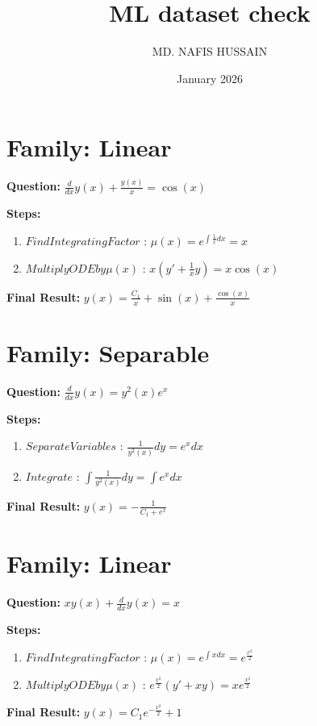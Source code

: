 \documentclass{article}
\title{ML dataset check}
\author{MD. NAFIS HUSSAIN}
\date{January 2026}
\begin{document}
\maketitle
\section*{Family: Linear}
\textbf{Question:} $\frac{d}{d x} y{\left(x \right)} + \frac{y{\left(x \right)}}{x} = \cos{\left(x \right)}$

\textbf{Steps:}
\begin{enumerate}
\item $Find Integrating Factor$ :  $\mu(x) = e^{\int \frac{1}{x} dx} = x$
\item $Multiply ODE by \mu(x)$ :  $x(y' + \frac{1}{x}y) = x \cos{\left(x \right)}$
\end{enumerate}
\textbf{Final Result:} $y{\left(x \right)} = \frac{C_{1}}{x} + \sin{\left(x \right)} + \frac{\cos{\left(x \right)}}{x}$

\section*{Family: Separable}
\textbf{Question:} $\frac{d}{d x} y{\left(x \right)} = y^{2}{\left(x \right)} e^{x}$

\textbf{Steps:}
\begin{enumerate}
\item $Separate Variables$ :  $\frac{1}{y^{2}{\left(x \right)}} dy = e^{x} dx$
\item $Integrate$ :  $\int \frac{1}{y^{2}{\left(x \right)}} dy = \int e^{x} dx$
\end{enumerate}
\textbf{Final Result:} $y{\left(x \right)} = - \frac{1}{C_{1} + e^{x}}$

\section*{Family: Linear}
\textbf{Question:} $x y{\left(x \right)} + \frac{d}{d x} y{\left(x \right)} = x$

\textbf{Steps:}
\begin{enumerate}
\item $Find Integrating Factor$ :  $\mu(x) = e^{\int x dx} = e^{\frac{x^{2}}{2}}$
\item $Multiply ODE by \mu(x)$ :  $e^{\frac{x^{2}}{2}}(y' + xy) = x e^{\frac{x^{2}}{2}}$
\end{enumerate}
\textbf{Final Result:} $y{\left(x \right)} = C_{1} e^{- \frac{x^{2}}{2}} + 1$
\end{document}
